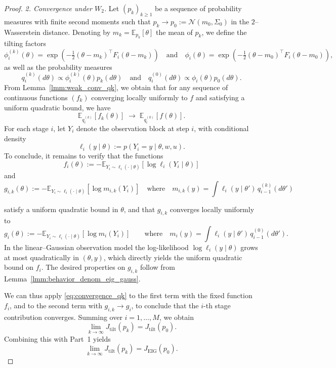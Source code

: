 \documentclass[10pt,a4paper]{amsart}
\begin{document}
\begin{proof}
\noindent\textit{2. Convergence under $W_2$.}
Let $(p_k)_{k\ge1}$ be a sequence of probability measures with finite second moments such that
\(
p_k \to p_0 := \mathcal N(m_0,\Sigma_0)
\) in the $2$--Wasserstein distance.
Denoting by $m_k=\mathbb E_{p_k}[\theta]$ the mean of $p_k$, we define the tilting factors
\[
\phi_i^{(k)}(\theta)
=
\exp\!\left(-\tfrac12(\theta-m_k)^\top F_i (\theta-m_k)\right) \quad \text{and} \quad \phi_i(\theta)
=
\exp\!\left(-\tfrac12(\theta-m_0)^\top F_i (\theta-m_0)\right),
\]
as well as the probability measures
\[
q_i^{(k)}(d\theta)
\propto
\phi_i^{(k)}(\theta)p_k(d\theta)\quad \text{and} \quad 
q_i^{(0)}(d\theta)
\propto
\phi_i(\theta)p_0(d\theta).
\]
From Lemma~\ref{lmm:weak_conv_qk}, we obtain that for any sequence of continuous functions $(f_k)$ converging locally uniformly to $f$ and satisfying a uniform quadratic bound, we have
\begin{equation}
\mathbb{E}_{q_i^{(k)}}[f_k(\theta)]
\;\longrightarrow\;
\mathbb{E}_{q_i^{(0)}}[f(\theta)]. \label{eq:convergence_qk}
\end{equation}
For each stage \(i\), let \(Y_i\) denote the observation block at step \(i\),
with conditional density
\[
\ell_i(y\mid\theta):=p(Y_i=y\mid\theta,w,u).
\]
To conclude, it remains to verify that the functions
\[
f_i(\theta)
:=
-\mathbb{E}_{Y_i\sim \ell_i(\cdot\mid\theta)}
[\log \ell_i(Y_i\mid\theta)]
\]
and
\[
g_{i,k}(\theta)
:=
-\mathbb{E}_{Y_i\sim \ell_i(\cdot\mid\theta)}
[\log m_{i,k}(Y_i)] \quad \text{where} \quad m_{i,k}(y)
=
\int \ell_i(y\mid\theta')\,q_{i-1}^{(k)}(d\theta')
\]


satisfy a uniform quadratic bound in \(\theta\), and that \(g_{i,k}\) converges locally uniformly to 
\[
g_i(\theta)
:=
-\mathbb{E}_{Y_i\sim \ell_i(\cdot\mid\theta)}
[\log m_i(Y_i)]
\qquad \text{where} \quad
m_i(y)
=
\int \ell_i(y\mid\theta')\,q_{i-1}^{(0)}(d\theta').
\]
In the linear--Gaussian observation model the log-likelihood
$\log \ell_i(y\mid\theta)$ grows at most quadratically in $(\theta,y)$, which directly yields the uniform quadratic bound on $f_i$. The desired properties on \(g_{i,k}\) follow from Lemma~\ref{lmm:behavior_denom_eig_gauss}.

We can thus apply \eqref{eq:convergence_qk} to the first term with the fixed function \(f_i\), and to the second term with \(g_{i,k}\to g_i\), to conclude that the \(i\)-th stage contribution converges. Summing over \(i=1,\dots,M\), we obtain
\[
\lim_{k\to\infty} J_{\mathrm{tilt}}(p_k)
=
J_{\mathrm{tilt}}(p_0).
\]
Combining this with Part~1 yields
\[
\lim_{k\to\infty} J_{\mathrm{tilt}}(p_k)
=
J_{\mathrm{EIG}}(p_0).
\]
\end{proof}
\end{document}
